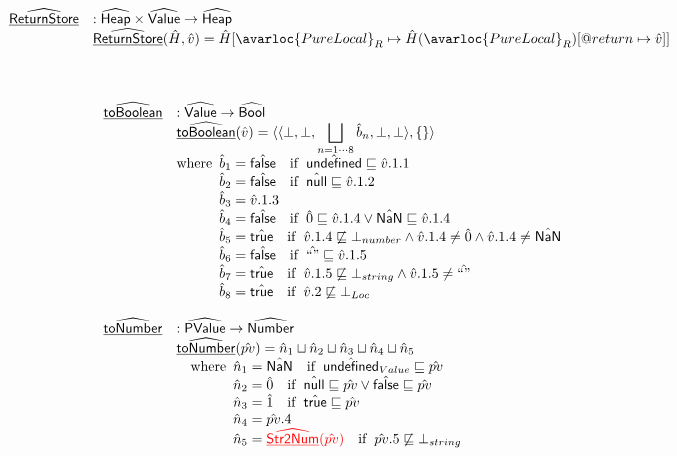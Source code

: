 \[\begin{array}{ll}
\ahf{ReturnStore} & : \aHeap \times \aValue \rightarrow \aHeap\\
& \ahf{ReturnStore}(\hat{H}, \hat{v}) = \hat{H}[\avarloc{PureLocal}_R \mapsto \hat{H}(\avarloc{PureLocal}_R)[\varprop{return} \mapsto \hat{v}]]\\
\\
\end{array}
\]
\\

\[
\begin{array}{ll}
\ahf{toBoolean} & : \aValue \rightarrow \abs{Bool} \\
& \ahf{toBoolean}(\hat{v})
  = \langle\langle \bot,\bot,\displaystyle\bigsqcup_{n=1\cdots8}\hat{b}_n,\bot,\bot\rangle,\{\}\rangle \\
& \wherec{
  \hat{b}_1 = \afalse \quad\ifc{\aundef\sqsubseteq\hat{v}.1.1}\\
  \hat{b}_2 = \afalse \quad\ifc{\anull\sqsubseteq\hat{v}.1.2}\\
  \hat{b}_3 = \hat{v}.1.3 \\
  \hat{b}_4 = \afalse \quad\ifc{\hat{0}\sqsubseteq\hat{v}.1.4\lor\hat{\SF{NaN}}\sqsubseteq\hat{v}.1.4} \\
  \hat{b}_5 = \atrue \quad\ifc{\hat{v}.1.4\not\sqsubseteq\bot_{number}\land\hat{v}.1.4\neq\hat{0}\land\hat{v}.1.4\neq\hat{\SF{NaN}}} \\
  \hat{b}_6 = \afalse \quad\ifc{\hat{``"}\sqsubseteq\hat{v}.1.5} \\
  \hat{b}_7 = \atrue \quad\ifc{\hat{v}.1.5\not\sqsubseteq\bot_{string}\land\hat{v}.1.5\neq\hat{``"}}\\
  \hat{b}_8 = \atrue \quad\ifc{\hat{v}.2\not\sqsubseteq\bot_{Loc}}\\
}\\\\

\ahf{toNumber} & : \abs{PValue} \rightarrow \abs{Number} \\
& \ahf{toNumber}(\hat{pv})
  = \hat{n}_1\sqcup\hat{n}_2\sqcup\hat{n}_3\sqcup\hat{n}_4\sqcup\hat{n}_5 \\
& \quad\wherec{
  \hat{n}_1 = \hat{\SF{NaN}}\quad\ifc{\aundef_{Value}\sqsubseteq\hat{pv}}\\
  \hat{n}_2 = \hat{0}\quad\ifc{\anull\sqsubseteq\hat{pv}\lor\afalse\sqsubseteq\hat{pv}}\\
  \hat{n}_3 = \hat{1}\quad\ifc{\atrue\sqsubseteq\hat{pv}}\\
  \hat{n}_4 = \hat{pv}.4\\
  \hat{n}_5 = {\inred \ahf{Str2Num}(\hat{pv})}\quad\ifc{\hat{pv}.5\not\sqsubseteq\bot_{string}}\\
}\\\\


\end{array}\]
